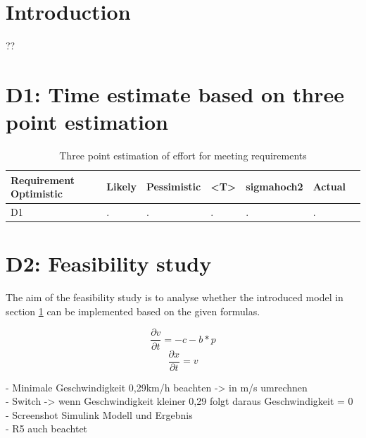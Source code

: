 
\chapter{Introduction}\label{cha:Introduction}
??
\chapter{D1: Time estimate based on three point estimation}\label{cha:D1}
\begin{table}[H]
\centering
\caption{Three point estimation of effort for meeting requirements}
\begin{adjustbox}{width=1\textwidth, center=\textwidth}
\renewcommand{\arraystretch}{1}
\begin{tabular}{lllllll}
\textbf{Requirement} \textbf{Optimistic} & \textbf{Likely} & \textbf{Pessimistic} & \textbf{<T>} & \textbf{sigmahoch2} & \textbf{Actual}\\\hline
D1 & .& .& .& .& .&\\
\end{tabular}

\end{adjustbox}
\label{tbl:ConceptTPTPProductionSymbols}
\end{table}
\chapter{D2: Feasibility study}\label{cha:D2}
The aim of the feasibility study is to analyse whether the introduced model in section \ref{cha:Introduction} can be implemented based on the given formulas. 

\begin{equation}
	\frac{\partial v}{\partial t} = -c-b*p
\end{equation}
\begin{equation}
	\frac{\partial x}{\partial t} = v
\end{equation}

- Minimale Geschwindigkeit 0,29km/h beachten -> in m/s umrechnen \\
- Switch -> wenn Geschwindigkeit kleiner 0,29 folgt daraus Geschwindigkeit = 0 \\
- Screenshot Simulink Modell und Ergebnis\\
- R5 auch beachtet \\

